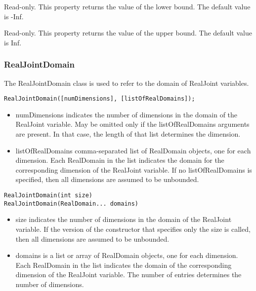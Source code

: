 \fi


\ifmatlab
{}
\fi
\ifjava
{}
\fi

Read-only.  This property returns the value of the lower bound.  The default value is -Inf.

\ifmatlab
{}
\fi
\ifjava
{}
\fi

Read-only.  This property returns the value of the upper bound.  The default value is Inf.



\subsubsection{RealJointDomain}
\label{sec:RealJointDomain}

The RealJointDomain class is used to refer to the domain of RealJoint variables.


\ifmatlab
\begin{lstlisting}
RealJointDomain([numDimensions], [listOfRealDomains]);
\end{lstlisting}

\begin{itemize}
\item numDimensions indicates the number of dimensions in the domain of the RealJoint variable.  May be omitted only if the listOfRealDomains arguments are present.  In that case, the length of that list determines the dimension.
\item listOfRealDomains comma-separated list of RealDomain objects, one for each dimension.  Each RealDomain in the list indicates the domain for the corresponding dimension of the RealJoint variable.  If no listOfRealDomains is specified, then all dimensions are assumed to be unbounded.
\end{itemize}
\fi

\ifjava
\begin{lstlisting}
RealJointDomain(int size)
RealJointDomain(RealDomain... domains)
\end{lstlisting}

\begin{itemize}
\item size indicates the number of dimensions in the domain of the RealJoint variable.  If the version of the constructor that specifies only the size is called, then all dimensions are assumed to be unbounded.
\item domains is a list or array of RealDomain objects, one for each dimension.  Each RealDomain in the list indicates the domain of the corresponding dimension of the RealJoint variable.  The number of entries determines the number of dimensions.
\end{itemize}
\fi

